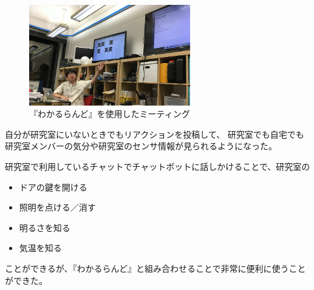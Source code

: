 \begin{figure}[h]
\centering
\includegraphics[width=7cm]{images/wara.png}
\caption{『わかるらんど』を使用したミーティング}
\label{wara}
\end{figure}

自分が研究室にいないときでもリアクションを投稿して、
研究室でも自宅でも研究室メンバーの気分や研究室のセンサ情報が見られるようになった。

研究室で利用しているチャットでチャットボットに話しかけることで、研究室の
\begin{itemize}
  \item ドアの鍵を開ける
  \item 照明を点ける／消す
  \item 明るさを知る
  \item 気温を知る
\end{itemize}
ことができるが、『わかるらんど』と組み合わせることで非常に便利に使うことができた。


